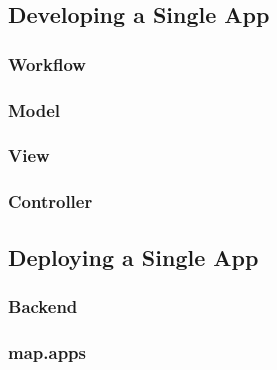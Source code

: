 
\subsection{Developing a Single App} 
\label{subsec:SingleAppDev}

\subsubsection{Workflow} 
\label{subsubsec:Workflow}

\subsubsection{Model} 
\label{subsubsec:Model}

\subsubsection{View} 
\label{subsubsec:View}

\subsubsection{Controller} 
\label{subsubsec:Controller}


\subsection{Deploying a Single App}
\label{subsec:SingleAppDev}

\subsubsection{Backend} 
\label{subsubsec:Backend}

\subsubsection{map.apps} 
\label{subsubsec:mapapps}
